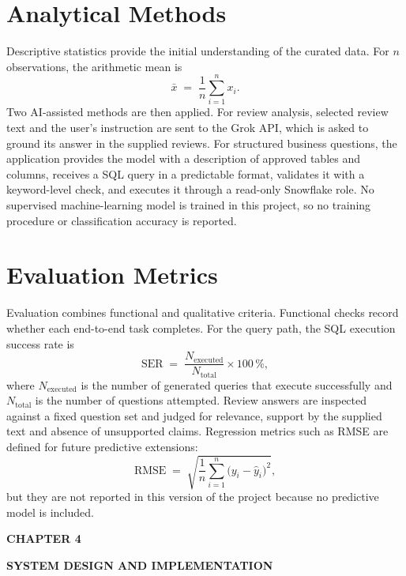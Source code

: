 \documentclass[12pt,a4paper]{report}
\newcommand{\chaptersplit}[2]{%
  \clearpage
  \thispagestyle{empty}%
  \vspace*{\fill}
  \begin{center}
    {\fontsize{16}{20}\selectfont\bfseries CHAPTER #1\par}
    \vspace{1.2cm}
    {\fontsize{16}{20}\selectfont\bfseries #2\par}
  \end{center}
  \vspace*{\fill}
  \clearpage
}
\begin{document}
\section{Analytical Methods}
Descriptive statistics provide the initial understanding of the curated data. For $n$ observations, the arithmetic mean is
\begin{equation*}
\bar{x} \;=\; \frac{1}{n}\sum_{i=1}^{n} x_i .
\end{equation*}
Two AI-assisted methods are then applied. For review analysis, selected review text and the user's instruction are sent to the Grok API, which is asked to ground its answer in the supplied reviews. For structured business questions, the application provides the model with a description of approved tables and columns, receives a SQL query in a predictable format, validates it with a keyword-level check, and executes it through a read-only Snowflake role. No supervised machine-learning model is trained in this project, so no training procedure or classification accuracy is reported.

\section{Evaluation Metrics}
Evaluation combines functional and qualitative criteria. Functional checks record whether each end-to-end task completes. For the query path, the SQL execution success rate is
\begin{equation*}
\text{SER} \;=\; \frac{N_{\text{executed}}}{N_{\text{total}}}\times 100\,\%,
\end{equation*}
where $N_{\text{executed}}$ is the number of generated queries that execute successfully and $N_{\text{total}}$ is the number of questions attempted. Review answers are inspected against a fixed question set and judged for relevance, support by the supplied text and absence of unsupported claims. Regression metrics such as RMSE are defined for future predictive extensions:
\begin{equation*}
\text{RMSE} \;=\; \sqrt{\frac{1}{n}\sum_{i=1}^{n}\bigl(y_i - \hat{y}_i\bigr)^{2}},
\end{equation*}
but they are not reported in this version of the project because no predictive model is included.

\chaptersplit{4}{SYSTEM DESIGN AND IMPLEMENTATION}
\end{document}
